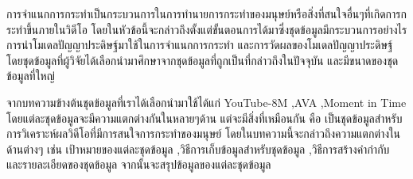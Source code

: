 การจำแนกการกระทำเป็นกระบวนการในการทำนายการกระทำของมนุษย์หรือสิ่งที่สนใจอื่นๆที่เกิดการกระทำขึ้นภายในวิดีโอ 
โดยในหัวข้อนี้จะกล่าวถึงตั้งแต่ขั้นตอนการได้มาซึ่งชุดข้อมูลมีกระบวนการอย่างไร การนำโมเดลปัญญาประดิษฐ์มาใช้ในการจำแนกการกระทำ และการวัดผลของโมเดลปัญญาประดิษฐ์
โดยชุดข้อมูลที่ผู้วิจัยได้เลือกนำมาศึกษาจากชุดข้อมูลที่ถูกเป็นที่กล่าวถึงในปัจจุบัน และมีขนาดของชุดข้อมูลที่ใหญ่

จากบทความข้างต้นชุดข้อมูลที่เราได้เลือกนำมาใช้ได้แก่ YouTube-8M ,AVA ,Moment in Time โดยแต่ละชุดข้อมูลจะมีความแตกต่างกันในหลายๆด้าน 
แต่จะมีสิ่งที่เหมือนกัน คือ เป็นชุดข้อมูลสำหรับการวิเคราะห์ผลวิดีโอที่มีการสนใจการกระทำของมนุษย์ โดยในบทความนี้จะกล่าวถึงความแตกต่างในด้านต่างๆ 
เช่น เป้าหมายของแต่ละชุดข้อมูล ,วิธีการเก็บข้อมูลสำหรับชุดข้อมูล ,วิธีการสร้างคำกำกับ และรายละเอียดของชุดข้อมูล จากนั้นจะสรุปข้อมูลของแต่ละชุดข้อมูล

